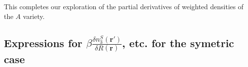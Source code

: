 \documentclass[letterpaper,twocolumn,amsmath,amssymb,jcp,10pt,aip]{revtex4-1}
\newcommand{\red}[1]{{\bf \color{red} #1}}
\newcommand{\fixme}[1]{\red{[#1]}}
\begin{document}
\begin{widetext}

This completes our exploration of the partial derivatives of weighted
densities of the $A$ variety.


\subsection{Expressions for $\beta\frac{\delta
    n_3^{S}(\mathbf{r}')}{\delta R(\mathbf{r})}$, etc. for the
  symetric case}\label{appendix:g-S}


\end{widetext}
\end{document}
